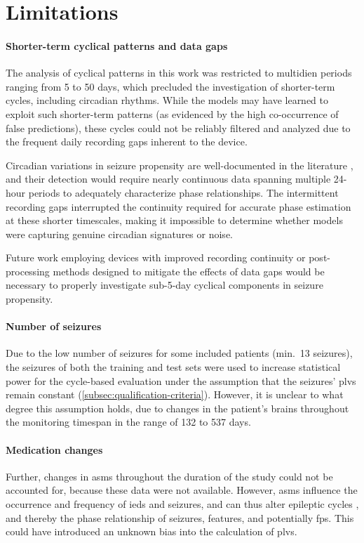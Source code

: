 \section{Limitations}\label{sec:limitations}
\paragraph{Shorter-term cyclical patterns and data gaps}\label{para:shorter-term-cyclical-patterns-and-data-gaps}
The analysis of cyclical patterns in this work was restricted to multidien periods ranging from 5 to 50 days, which precluded the investigation of shorter-term cycles, including circadian rhythms.
While the models may have learned to exploit such shorter-term patterns (as evidenced by the high co-occurrence of false predictions), these cycles could not be reliably filtered and analyzed due to the frequent daily recording gaps inherent to the device.

Circadian variations in seizure propensity are well-documented in the literature \parencite{karoly_cycles_2021}, and their detection would require nearly continuous data spanning multiple 24-hour periods to adequately characterize phase relationships.
The intermittent recording gaps interrupted the continuity required for accurate phase estimation at these shorter timescales, making it impossible to determine whether models were capturing genuine circadian signatures or noise.

Future work employing devices with improved recording continuity or post-processing methods designed to mitigate the effects of data gaps would be necessary to properly investigate sub-5-day cyclical components in seizure propensity.


\paragraph{Number of seizures}
Due to the low number of seizures for some included patients (min.\ \num{13} seizures), the seizures of both the training and test sets were used to increase statistical power for the cycle-based evaluation under the assumption that the seizures' \glspl{plv} remain constant (\cref{subsec:qualification-criteria}).
However, it is unclear to what degree this assumption holds, due to changes in the patient's brains throughout the monitoring timespan in the range of \num{132} to \num{537} days.


\paragraph{Medication changes}
Further, changes in \glspl{asm} throughout the duration of the study could not be accounted for, because these data were not available.
However, \glspl{asm} influence the occurrence and frequency of \glspl{ied} and seizures, and can thus alter epileptic cycles \parencite{reynolds_early_2025}, and thereby the phase relationship of seizures, features, and potentially \glspl{fp}.
This could have introduced an unknown bias into the calculation of \glspl{plv}.
